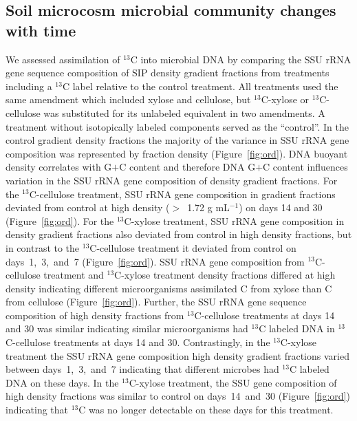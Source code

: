 \subsection{Soil microcosm microbial community changes with time}
We assessed assimilation of $^{13}$C into microbial DNA by comparing the SSU
rRNA gene sequence composition of SIP density gradient fractions from
treatments including a $^{13}$C label relative to the control treatment. All
treatments used the same amendment which included xylose and cellulose, but
$^{13}$C-xylose or $^{13}$C-cellulose was substituted for its unlabeled
equivalent in two amendments. A treatment without isotopically labeled
components served as the ``control''. In the control gradient density fractions
the majority of the variance in SSU rRNA gene composition was represented by
fraction density (Figure~\ref{fig:ord}). DNA buoyant density correlates with
G$+$C content \citep{Buckley_2007} and therefore DNA G$+$C content influences
variation in the SSU rRNA gene composition of density gradient fractions. For
the $^{13}$C-cellulose treatment, SSU rRNA gene composition in gradient
fractions deviated from control at high density ($>$~1.72 g mL$^{-1}$) on days
14 and 30 (Figure~\ref{fig:ord}). For the $^{13}$C-xylose treatment, SSU rRNA
gene composition in density gradient fractions also deviated from control in
high density fractions, but in contrast to the $^{13}$C-cellulose treatment it
deviated from control on days~1,~3,~and~7 (Figure~\ref{fig:ord}). SSU rRNA gene
composition from $^{13}$C-cellulose treatment and $^{13}$C-xylose treatment
density fractions differed at high density indicating different microorganisms
assimilated C from xylose than C from cellulose
(Figure~\ref{fig:ord}). Further, the SSU rRNA gene sequence composition of high
density fractions from $^{13}$C-cellulose treatments at days 14 and 30 was
similar indicating similar microorganisms had $^{13}$C labeled DNA in
$^{13}$C-cellulose treatments at days 14 and 30. Contrastingly, in the
$^{13}$C-xylose treatment the SSU rRNA gene composition high density gradient
fractions varied between days~1,~3,~and~7 indicating that different microbes
had $^{13}$C labeled DNA on these days. In the $^{13}$C-xylose treatment, the
SSU gene composition of high density fractions was similar to control on
days~14~and~30 (Figure~\ref{fig:ord}) indicating that $^{13}$C was no longer
detectable on these days for this treatment. 

